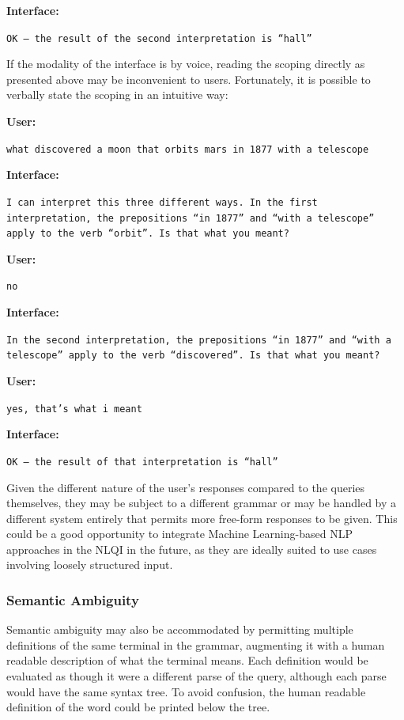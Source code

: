 \documentclass[../main.tex]{subfiles}
\begin{document}
\begin{refsection}
\noindent \textbf{Interface:}

\texttt{OK -- the result of the second interpretation is ``hall''}

\examplespacing

\noindent If the modality of the interface is by voice, reading the scoping directly as presented above may be inconvenient to users.  Fortunately, it is possible to verbally state the scoping in an intuitive way:

\examplespacing

\noindent \textbf{User:}

\texttt{what discovered a moon that orbits mars in 1877 with a telescope}

\noindent \textbf{Interface:}

\texttt{I can interpret this three different ways. In the first interpretation, the prepositions ``in 1877'' and ``with a telescope'' apply to the verb ``orbit''.  Is that what you meant?}

\noindent \textbf{User:}

\texttt{no}

\noindent \textbf{Interface:}

\texttt{In the second interpretation, the prepositions ``in 1877'' and \linebreak ``with a telescope'' apply to the verb ``discovered''.
	Is that	\linebreak what you meant?}

\noindent \textbf{User:}

\texttt{yes, that's what i meant}

\noindent \textbf{Interface:}

\texttt{OK -- the result of that interpretation is ``hall''}

\examplespacing

\noindent Given the different nature of the user's responses compared to the queries themselves, they may be subject to a different grammar or may be handled by a different system entirely that permits more free-form responses to be given. This could be a good opportunity to integrate Machine Learning-based NLP approaches in the NLQI in the future, as they are ideally suited to use cases involving loosely structured input.

\subsubsection{Semantic Ambiguity}

Semantic ambiguity may also be accommodated by permitting multiple definitions of the same terminal in the grammar, augmenting it with a human readable description of what the terminal means.  Each definition would be evaluated as though it were a different parse of the query, although each parse would have the same syntax tree.  To avoid confusion, the human readable definition of the word could be printed below the tree.


\end{refsection}
\end{document}
